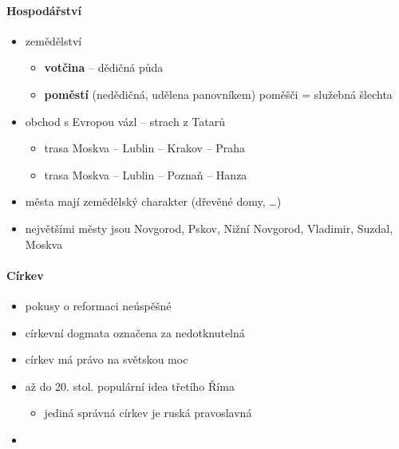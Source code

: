 \paragraph{Hospodářství}
\begin{itemize}
\item zemědělství
	\begin{itemize}
	\item \textbf{votčina} -- dědičná půda
	\item \textbf{poměstí} (nedědičná, udělena panovníkem) \ra poměšči = služebná šlechta
	\end{itemize}
\item obchod s Evropou vázl -- strach z Tatarů
	\begin{itemize}
	\item trasa Moskva -- Lublin -- Krakov -- Praha
	\item trasa Moskva -- Lublin -- Poznaň -- Hanza
	\end{itemize}
\item města mají zemědělský charakter (dřevěné domy, \ldots)
\item největšími městy jsou Novgorod, Pskov, Nižní Novgorod, Vladimir, Suzdal, Moskva
\end{itemize}

\paragraph{Církev}
\begin{itemize}
\item pokusy o reformaci neúspěšné
\item církevní dogmata označena za nedotknutelná
\item církev má právo na světskou moc
\item až do 20. stol. populární idea třetího Říma 
	\begin{itemize}
	\item jediná správná církev je ruská pravoslavná
	\end{itemize}
\item {}
\end{itemize}


